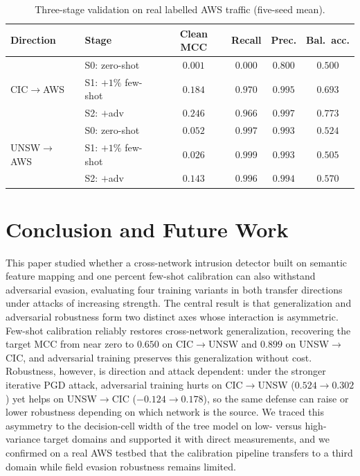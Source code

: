 \documentclass[11pt,a4paper]{article}
\begin{document}
\begin{table}[htbp]
\centering
\caption{Three-stage validation on real labelled AWS traffic (five-seed mean).}
\label{tab:aws}
\footnotesize
\begin{tabular}{llcccc}
\toprule
Direction & Stage & Clean MCC & Recall & Prec. & Bal.\ acc. \\
\midrule
\multirow{3}{*}{CIC$\rightarrow$AWS}
 & S0: zero-shot        & $0.001$ & $0.000$ & $0.800$ & $0.500$ \\
 & S1: $+1\%$ few-shot  & $0.184$ & $0.970$ & $0.995$ & $0.693$ \\
 & S2: $+$adv           & $\mathbf{0.246}$ & $0.966$ & $0.997$ & $\mathbf{0.773}$ \\
\midrule
\multirow{3}{*}{UNSW$\rightarrow$AWS}
 & S0: zero-shot        & $0.052$ & $0.997$ & $0.993$ & $0.524$ \\
 & S1: $+1\%$ few-shot  & $0.026$ & $0.999$ & $0.993$ & $0.505$ \\
 & S2: $+$adv           & $\mathbf{0.143}$ & $0.996$ & $0.994$ & $\mathbf{0.570}$ \\
\bottomrule
\end{tabular}
\end{table}

\section{Conclusion and Future Work}
\label{sec:conclusion}
This paper studied whether a cross-network intrusion detector built on semantic
feature mapping and one percent few-shot calibration can also withstand adversarial
evasion, evaluating four training variants in both transfer directions under attacks
of increasing strength. The central result is that generalization and adversarial
robustness form two distinct axes whose interaction is asymmetric. Few-shot
calibration reliably restores cross-network generalization, recovering the target MCC
from near zero to $0.650$ on CIC$\rightarrow$UNSW and $0.899$ on UNSW$\rightarrow$CIC,
and adversarial training preserves this generalization without cost. Robustness,
however, is direction and attack dependent: under the stronger iterative PGD attack,
adversarial training hurts on CIC$\rightarrow$UNSW ($0.524\rightarrow0.302$) yet helps
on UNSW$\rightarrow$CIC ($-0.124\rightarrow0.178$), so the same defense can raise or
lower robustness depending on which network is the source. We traced this asymmetry
to the decision-cell width of the tree model on low- versus high-variance target
domains and supported it with direct measurements, and we confirmed on a real AWS
testbed that the calibration pipeline transfers to a third domain while field evasion
robustness remains limited.
\end{document}
